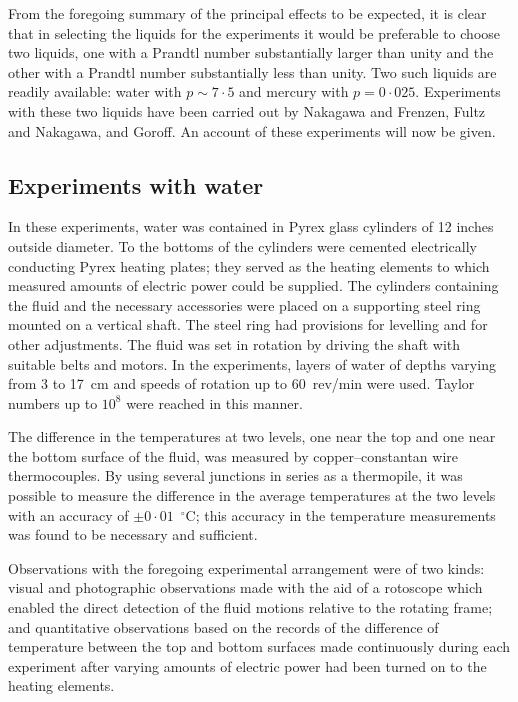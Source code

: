 From the foregoing summary of the principal effects to be expected,
it is clear that in selecting the liquids for the experiments it would be
preferable to choose two liquids, one with a Prandtl number substantially
larger than unity and the other with a Prandtl number substantially less
than unity.  Two such liquids are readily available: water with $p \sim 7{\cdot}5$
and mercury with $p = 0{\cdot}025$.  Experiments with these two liquids have
been carried out by Nakagawa and Frenzen, Fultz and Nakagawa, and
Goroff.  An account of these experiments will now be given.

\subsection{Experiments with water}
\label{sec:35a}

In these experiments, water was contained in Pyrex glass cylinders
of 12 inches outside diameter.  To the bottoms of the cylinders were
cemented electrically conducting Pyrex heating plates; they served as
the heating elements to which measured amounts of electric power could
be supplied.  The cylinders containing the fluid and the necessary
accessories were placed on a supporting steel ring mounted on a vertical
shaft.  The steel ring had provisions for levelling and for other adjust\-ments.
The fluid was set in rotation by driving the shaft with suitable
belts and motors.  In the experiments, layers of water of depths varying
from 3 to 17~cm and speeds of rotation up to 60~rev/min were used.  Taylor
numbers up to $10^8$ were reached in this manner.

The difference in the temperatures at two levels, one near the top and
one near the bottom surface of the fluid, was measured by copper--constantan
wire thermocouples.  By using several junctions in series as
a thermopile, it was possible to measure the difference in the average
temperatures at the two levels with an accuracy of $\pm 0{\cdot}01$~$^\circ$C; this
accuracy in the temperature measurements was found to be necessary
and sufficient.

Observations with the foregoing experimental arrangement were of
two kinds: visual and photographic observations made with the aid of a
rotoscope which enabled the direct detection of the fluid motions
relative to the rotating frame; and quantitative observations based on
the records of the difference of temperature between the top and bottom
surfaces made continuously during each experiment after varying
amounts of electric power had been turned on to the heating elements.

